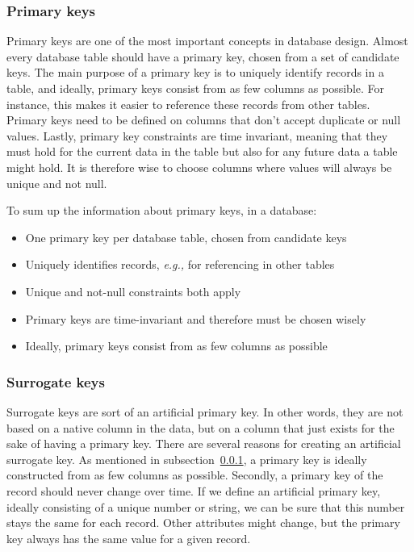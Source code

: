 \documentclass[11pt]{article}
\begin{document}
    \subsubsection{Primary keys} \label{subsubsec:primary_keys}

    Primary keys are one of the most important concepts in database design.
    Almost every database table should have a primary key, chosen from a set of candidate keys.
    The main purpose of a primary key is to uniquely identify records in a table, and ideally, primary keys consist from as few columns as possible.
    For instance, this makes it easier to reference these records from other tables.
    Primary keys need to be defined on columns that don't accept duplicate or null values.
    Lastly, primary key constraints are time invariant, meaning that they must hold for the current data in the table \textemdash but also for any future data a table might hold.
    It is therefore wise to choose columns where values will always be unique and not null.

    To sum up the information about primary keys, in a database:

    \begin{itemize}
        \item One primary key per database table, chosen from candidate keys
        \item Uniquely identifies records, \textit{e.g.,} for referencing in other tables
        \item Unique and not-null constraints both apply
        \item Primary keys are time-invariant and therefore must be chosen wisely
        \item Ideally, primary keys consist from as few columns as possible
    \end{itemize}

    \subsubsection{Surrogate keys} \label{subsubsec:surrogate_keys}

    Surrogate keys are sort of an artificial primary key.
    In other words, they are not based on a native column in the data, but on a column that just exists for the sake of having a primary key.
    There are several reasons for creating an artificial surrogate key.
    As mentioned in subsection~\ref{subsubsec:primary_keys}, a primary key is ideally constructed from as few columns as possible.
    Secondly, a primary key of the record should never change over time.
    If we define an artificial primary key, ideally consisting of a unique number or string, we can be sure that this number stays the same for each record.
    Other attributes might change, but the primary key always has the same value for a given record.
\end{document}
